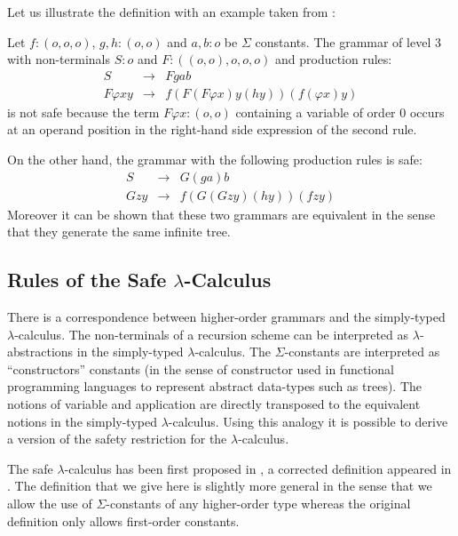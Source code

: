 Let us illustrate the definition with an example taken from \cite{KNU02}:
\begin{exmp} Let $f:(o,o,o)$, $g,h:(o,o)$ and $a,b:o$ be $\Sigma$ constants.
 The grammar of level 3 with non-terminals $S:o$ and $F: ((o,o),o,o,o)$ and production rules:
\begin{eqnarray*}
    S &\rightarrow&  F g a b \\
    F \varphi x y &\rightarrow& f ( F ( F \varphi x ) y (h y)) (f (\varphi x) y)
\end{eqnarray*}
is not safe because the term $F \varphi x : (o,o)$ containing a variable of order $0$
occurs at an operand position in the right-hand side expression of the second rule.

On the other hand, the grammar with the following production rules is safe:
\begin{eqnarray*}
    S &\rightarrow&  G (g a) b \\
    G z y &\rightarrow& f ( G ( G z y) (h y)) (f z y)
\end{eqnarray*}
Moreover it can be shown that these two grammars are equivalent in the sense that they generate the same
infinite tree.
\end{exmp}


\subsection{Rules of the Safe $\lambda$-Calculus}

There is a correspondence between higher-order grammars and the simply-typed $\lambda$-calculus. The non-terminals of a recursion scheme can be interpreted as $\lambda$-abstractions in the
simply-typed $\lambda$-calculus. The $\Sigma$-constants are
interpreted as ``constructors'' constants (in the sense of
constructor used in functional programming languages to represent
abstract data-types such as trees). The notions of variable and
application are directly transposed to the equivalent notions in the
simply-typed $\lambda$-calculus. Using this analogy it is possible
to derive a version of the safety restriction for the
$\lambda$-calculus.

The safe $\lambda$-calculus has been first proposed in
\cite{DBLP:conf/fossacs/AehligMO05}, a corrected definition appeared
in \cite{Ong2005}. The definition that we give here is slightly more
general in the sense that we allow the use of $\Sigma$-constants of
any higher-order type whereas the original definition only allows
first-order constants.


